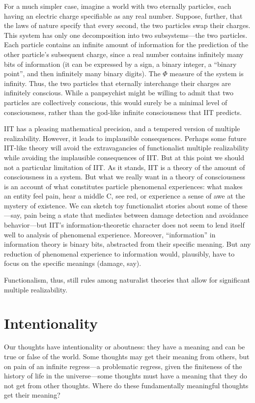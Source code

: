 For a much simpler case, imagine a world with two eternally particles, each having an electric charge specifiable
as any real number. Suppose, further, that the laws of nature specify that every second, the two particles swap their charges. This system has only one decomposition into two subsystems---the two particles. Each particle contains 
an infinite amount of information for the prediction of the other particle's subsequent charge, since a real
number contains infinitely many bits of information (it can be expressed by a sign, a binary integer, a ``binary 
point'', and then infinitely many binary digits). The $\Phi$ measure of the system is infinity. Thus, the two 
particles that eternally interchange their charges are infinitely conscious. While a panpsychist might be willing to 
admit that two particles are collectively conscious, this would surely be a minimal level of consciousness, rather than 
the god-like infinite consciousness that IIT predicts.

IIT has a pleasing mathematical precision, and a tempered version of multiple realizability. However, it leads to 
implausible consequences. Perhaps some future IIT-like theory will avoid the extravagancies of functionalist multiple
realizability while avoiding the implausible consequences of IIT. But at this point we should not a particular 
limitation of IIT. As it stands, IIT is a theory of the amount of consciousness in a system. But what we really 
want in a theory of consciousness is an account of what constitutes particle phenomenal experiences: what makes 
an entity feel pain, hear a middle C, see red, or experience a sense of awe at the mystery of existence. We can 
sketch toy functionalist stories about some of these---say, pain being a state that mediates between damage detection
and avoidance behavior---but IIT's information-theoretic character does not seem to lend itself well to analysis of 
phenomenal experience. Moreover, ``information'' in information theory is binary bits, abstracted from their specific 
meaning. But any reduction of phenomenal experience to information would, plausibly, have to focus on the specific 
meanings (damage, say). 

Functionalism, thus, still rules among naturalist theories that allow for significant multiple realizability.

\section{Intentionality}
Our thoughts have intentionality or aboutness: they have a meaning and can be true or false of the world. 
Some thoughts may get their meaning from others, but on pain of an infinite regress---a problematic regress, given the 
finiteness of the history of life in the universe---some thoughts must have a meaning that they do not get from 
other thoughts. Where do these fundamentally meaningful thoughts get their meaning?

